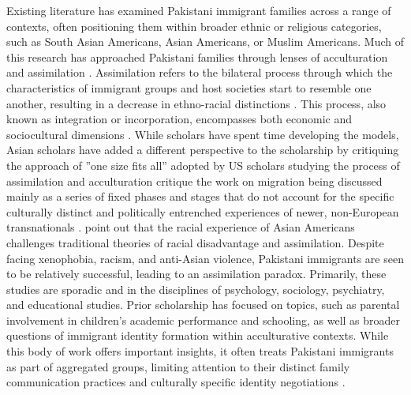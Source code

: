  Existing literature has examined Pakistani immigrant families across a range of contexts, often positioning them within broader ethnic or religious categories, such as South Asian Americans, Asian Americans, or Muslim Americans. Much of this research has approached Pakistani families through lenses of acculturation and assimilation \citep{barkerAcculturationCommunicationFamily2019, bhatiaTheorizingIdentityTransnational2009, kleinRelationshipAcculturationMental2020, myers-wallsLivingLifeTwo2011}. Assimilation refers to the bilateral process through which the characteristics of immigrant groups and host societies start to resemble one another, resulting in a decrease in ethno-racial distinctions \citep{beanAssimilationModelsOld2006, leeAsianAmericanAssimilation2024}. This process, also known as integration or incorporation, encompasses both economic and sociocultural dimensions \citep{leeAsianAmericanAssimilation2024}. While scholars have spent time developing the models, Asian scholars have added a different perspective to the scholarship by critiquing the approach of  ''one size fits all'' adopted by US scholars studying the process of assimilation and acculturation \citet{bhatiaTheorizingIdentityTransnational2009} critique the work on migration being discussed mainly as a series of fixed phases and stages that do not account for the specific culturally distinct and politically entrenched experiences of newer, non-European transnationals \citep{leeAsianAmericanAssimilation2024, bornsteinImmigrationAcculturationParenting2020, bhatiaTheorizingIdentityTransnational2009, beanAssimilationModelsOld2006, ngAreMuslimImmigrants2022, samAcculturationConceptualBackground2006}. \citet{leeAsianAmericanAssimilation2024} point out that the racial experience of Asian Americans challenges traditional theories of racial disadvantage and assimilation. Despite facing xenophobia, racism, and anti-Asian violence, Pakistani immigrants are seen to be relatively successful, leading to an assimilation paradox. Primarily, these studies are sporadic and in the disciplines of psychology, sociology, psychiatry, and educational studies. Prior scholarship has focused on topics, such as parental involvement in children’s academic performance and schooling, as well as broader questions of immigrant identity formation within acculturative contexts. While this body of work offers important insights, it often treats Pakistani immigrants as part of aggregated groups, limiting attention to their distinct family communication practices and culturally specific identity negotiations \citep{chaudharyTaleTwoGenerations2024, leoHighExpectationsCautionary2022, iqbalGenerationGameParenting2018, mohammad-arifMasalaIdentityYoung2000, rasoolBangladeshiIndianPakistani2020, kaliaBufferingParentchildConflict2022, ngAreMuslimImmigrants2022, chanEarlyLookParental2020, attias-donfutIntergenerationalRelationshipsMigrant2017, chungGenderEthnicityAcculturation2001, kleinRelationshipAcculturationMental2020, deepakParentingProcessMigration2005, leeAsianAmericanAssimilation2024, mohamedReligionAsianAmericans2023, masoodGenderFamilyCommunity2009, sirinHyphenatedSelvesMuslim2007, mohammad-arifMasalaIdentityYoung2000, maeshimaMentalHealthStigma2022}.
 
